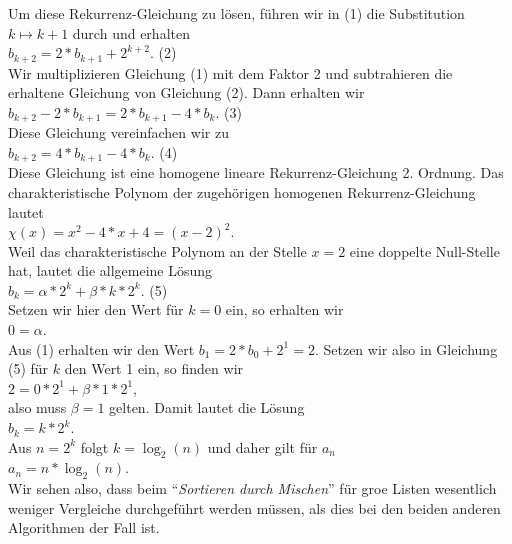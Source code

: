 Um diese Rekurrenz-Gleichung zu l\"osen, f\"uhren wir in (1) die Substitution $k \mapsto k+1$ durch und erhalten \\[0.1cm]
\hspace*{1.3cm}  $b_{k+2} = 2 * b_{k+1} + 2^{k+2}$. \hspace*{\fill} (2) \\[0.1cm]
Wir multiplizieren Gleichung (1) mit dem Faktor 2 und subtrahieren die erhaltene Gleichung von Gleichung (2). 
Dann erhalten wir \\[0.1cm]
\hspace*{1.3cm}  $b_{k+2} - 2 * b_{k+1} = 2 * b_{k+1} - 4 * b_k$. \hspace*{\fill} (3) \\[0.1cm]
Diese Gleichung vereinfachen wir zu \\[0.1cm]
\hspace*{1.3cm}  $b_{k+2} = 4 * b_{k+1} - 4 * b_k$. \hspace*{\fill} (4) \\[0.1cm]
Diese Gleichung ist eine homogene lineare Rekurrenz-Gleichung 2. Ordnung.
Das charakteristische Polynom der zugeh\"origen homogenen Rekurrenz-Gleichung lautet \\[0.1cm]
\hspace*{1.3cm} $\displaystyle \chi(x) = x^2 - 4 *x + 4 = (x-2)^2$. \\[0.1cm]
Weil das charakteristische Polynom an der Stelle $x=2$ eine doppelte Null-Stelle hat, 
lautet die allgemeine L\"osung \\[0.1cm]
\hspace*{1.3cm} $\displaystyle b_k = \alpha * 2^k + \beta * k * 2^k$. \hspace*{\fill} (5) \\[0.1cm]
Setzen wir hier den Wert f\"ur $k=0$ ein, so erhalten wir \\[0.1cm]
\hspace*{1.3cm} $0 = \alpha$. \\[0.1cm]
Aus (1) erhalten wir den Wert $b_1 = 2 * b_0 + 2^1 = 2$.  Setzen wir also in Gleichung (5) f\"ur $k$ den Wert 1 ein, 
so finden wir \\[0.1cm]
\hspace*{1.3cm} $2 = 0 * 2^1 + \beta * 1 * 2^1$,  \\[0.1cm]
also muss $\beta = 1$ gelten.  Damit lautet die L\"osung \\[0.1cm]
\hspace*{1.3cm} $b_k = k * 2^k$. \\[0.1cm]
Aus $n = 2^k$ folgt $k = \log_2(n)$ und daher gilt f\"ur $a_n$ \\[0.1cm]
\hspace*{1.3cm} $a_n = n * \log_2(n)$. \\[0.1cm]
Wir sehen also, dass beim ``\emph{Sortieren durch Mischen}'' f\"ur gro\3e Listen wesentlich weniger Vergleiche
durchgef\"uhrt werden m\"ussen, als dies bei den beiden anderen Algorithmen der Fall ist.

